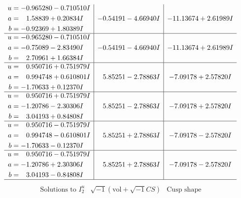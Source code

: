 \documentclass[1p]{elsarticle_modified}
\theoremstyle{definition}
\newcommand{\I}{\sqrt{-1}}
\begin{document}
$$\begin{array}{c|c|c}
\begin{aligned}
u &= -0.965280 - 0.710510 I \\
a &= \phantom{-}1.58839 + 0.20834 I \\
b &= -0.92369 + 1.80389 I\end{aligned}
 & -0.54191 - 4.66940 I & -11.13674 + 2.61989 I \\ \hline\begin{aligned}
u &= -0.965280 - 0.710510 I \\
a &= -0.75089 - 2.83490 I \\
b &= \phantom{-}2.70961 + 1.66384 I\end{aligned}
 & -0.54191 - 4.66940 I & -11.13674 + 2.61989 I \\ \hline\begin{aligned}
u &= \phantom{-}0.950716 + 0.751979 I \\
a &= \phantom{-}0.994748 + 0.610801 I \\
b &= -1.70633 + 0.12370 I\end{aligned}
 & \phantom{-}5.85251 - 2.78863 I & -7.09178 + 2.57820 I \\ \hline\begin{aligned}
u &= \phantom{-}0.950716 + 0.751979 I \\
a &= -1.20786 - 2.30306 I \\
b &= \phantom{-}3.04193 + 0.84808 I\end{aligned}
 & \phantom{-}5.85251 - 2.78863 I & -7.09178 + 2.57820 I \\ \hline\begin{aligned}
u &= \phantom{-}0.950716 - 0.751979 I \\
a &= \phantom{-}0.994748 - 0.610801 I \\
b &= -1.70633 - 0.12370 I\end{aligned}
 & \phantom{-}5.85251 + 2.78863 I & -7.09178 - 2.57820 I \\ \hline\begin{aligned}
u &= \phantom{-}0.950716 - 0.751979 I \\
a &= -1.20786 + 2.30306 I \\
b &= \phantom{-}3.04193 - 0.84808 I\end{aligned}
 & \phantom{-}5.85251 + 2.78863 I & -7.09178 - 2.57820 I\\
 \hline 
 \end{array}$$\newpage$$\begin{array}{c|c|c}  
\text{Solutions to }I^u_{2}& \I (\text{vol} + \sqrt{-1}CS) & \text{Cusp shape}\\
 \hline 
\begin{aligned}

\end{aligned}
\end{array}$$
\end{document}
